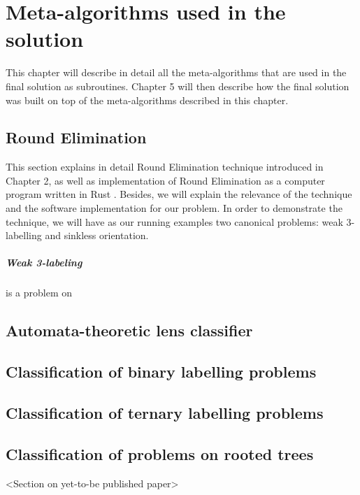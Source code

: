 \chapter{Meta-algorithms used in the solution}
\label{chapter:environment}

This chapter will describe in detail all the meta-algorithms that are
used in the final solution as subroutines.
Chapter 5 will then
describe how the final solution was built on top of the meta-algorithms
described in this chapter.

\section{Round Elimination}

This section explains in detail Round Elimination
technique introduced in Chapter 2, as well as
implementation of Round Elimination as a computer
program written in Rust \cite{Brandt2019, Olivetti2020}.
Besides, we will explain the relevance of the technique
and the software implementation for our problem. In order
to demonstrate the technique, we will have as our running
examples two canonical problems: weak 3-labelling and sinkless orientation.

\paragraph{Weak 3-labeling} is a problem on 

\section{Automata-theoretic lens classifier}

\section{Classification of binary labelling problems}

\section{Classification of ternary labelling problems}

\section{Classification of problems on rooted trees}

<Section on yet-to-be published paper>

